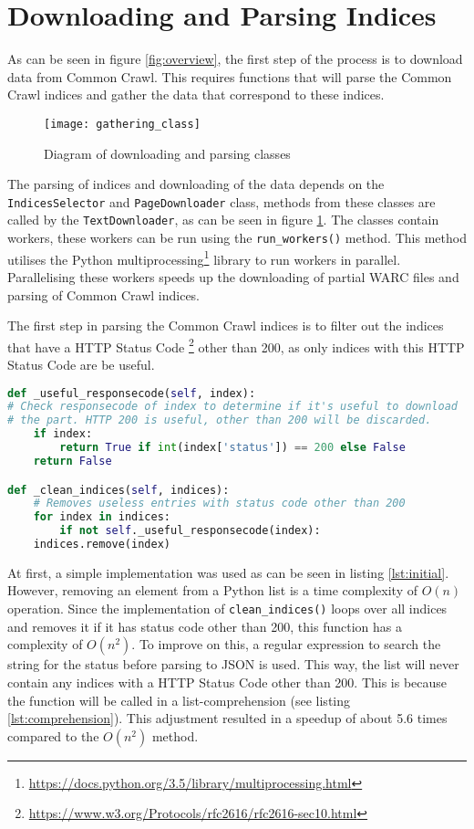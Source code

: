 \section{Downloading and Parsing Indices}\label{sec:5-downloading}

As can be seen in figure \ref{fig:overview}, the first step of the process is to download data from Common Crawl. This requires functions that will parse the Common Crawl indices and gather the data that correspond to these indices. 

\begin{figure}[H]
\centering
\texttt{[image: gathering\_class]}
\caption{Diagram of downloading and parsing classes}
\label{fig:gathering_class}
\end{figure}

The parsing of indices and downloading of the data depends on the \texttt{IndicesSelector} and \texttt{PageDownloader} class, methods from these classes are called by the \texttt{TextDownloader}, as can be seen in figure \ref{fig:gathering_class}. The classes contain workers, these workers can be run  using the \texttt{run\_workers()} method. This method utilises the Python multiprocessing\footnote{\url{https://docs.python.org/3.5/library/multiprocessing.html}} library to run workers in parallel. Parallelising these workers speeds up the downloading of partial WARC files and parsing of Common Crawl indices.

The first step in parsing the Common Crawl indices is to filter out the indices that have a HTTP Status Code \footnote{\url{https://www.w3.org/Protocols/rfc2616/rfc2616-sec10.html}} other than 200, as only indices with this HTTP Status Code are be useful. 

\begin{lstlisting}[language=Python, caption=Initial implementation, label={lst:initial}]
def _useful_responsecode(self, index):
# Check responsecode of index to determine if it's useful to download
# the part. HTTP 200 is useful, other than 200 will be discarded.
    if index:
        return True if int(index['status']) == 200 else False
    return False

def _clean_indices(self, indices):
    # Removes useless entries with status code other than 200
    for index in indices:
        if not self._useful_responsecode(index):
    indices.remove(index)
\end{lstlisting}

At first, a simple implementation was used as can be seen in listing \ref{lst:initial}. However, removing an element from a Python list is a time complexity of $O(n)$ operation. Since the implementation of \texttt{clean\_indices()} loops over all indices and removes it if it has status code other than 200, this function has a complexity of $O(n^2)$. To improve on this, a regular expression to search the string for the status before parsing to JSON is used. This way, the list will never contain any indices with a HTTP Status Code other than 200. This is because the function will be called in a list-comprehension (see listing \ref{lst:comprehension}). This adjustment resulted in a speedup of about 5.6 times compared to the $O(n^2)$ method.


